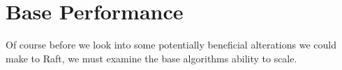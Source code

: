 \section{Base Performance}

Of course before we look into some potentially beneficial alterations we could make to Raft, we must examine the base algorithms ability to scale.
